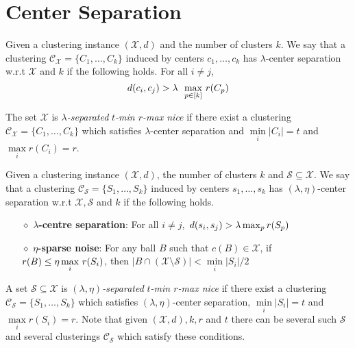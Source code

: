 \documentclass[anon,12pt]{colt2016} %
\newcommand{\mc}{\mathcal}
\begin{document}
\section{Center Separation}

\begin{definition}
\label{defn:lambdacs}
Given a clustering instance $(\mc X, d)$ and the number of clusters $k$. We say that a clustering $\mc C_{\mc X} = \{C_1, \ldots, C_k\}$ induced by centers $c_1, \ldots, c_k$ has $\lambda$-center separation w.r.t $\mc X$ and $k$ if the following holds. For all $i\neq j$, 
$$d(c_i, c_j) > \lambda \enspace\max_{p \in [k]} \thinspace r(C_p)$$
\end{definition}

\noindent The set $\mc X$ is {\it $\lambda$-separated} {\it $t$-min $r$-max nice} if there exist a clustering $\mc C_{\mc X}=\{C_1,\ldots,C_k\}$ which satisfies $\lambda$-center separation and $\min\limits_{i} \lvert C_i\rvert = t$ and $\max\limits_{i} r(C_i) = r$.

\begin{definition}
Given a clustering instance $(\mc X, d)$, the number of clusters $k$ and $\mc S \subseteq \mc X$. We say that a clustering $\mc C_{\mc S} = \{S_1, \ldots, S_k\}$ induced by centers $s_1, \ldots, s_k$ has $(\lambda, \eta)$-center separation w.r.t $\mc X, \mc S$ and $k$ if the following holds.

\begin{itemize}[nolistsep, noitemsep]
\label{defn:lambdacsnoise}	

\item[$\diamond$] {\bf $\lambda$-centre separation}: For all $i\neq j$, $\thinspace d(s_i, s_j) > \lambda \max_{p} r(S_p)$
\item[$\diamond$]{\bf $\eta$-sparse noise}: For any ball $B$ such that $c(B)\in \mathcal{X}$, if $r(B)\leq \eta\max\limits_{i} \thinspace r(S_i)$, then $|B\cap (\mc X\setminus \mc S)| < \min\limits_{i} |S_i|/2$
\end{itemize}
\end{definition}

\noindent A set $\mc S \subseteq \mc X$ is {\it $(\lambda, \eta)$-separated} {\it $t$-min $r$-max nice} if there exist a clustering $\mc C_{\mc S}=\{S_1,\ldots,S_k\}$ which satisfies $(\lambda, \eta)$-center separation,  $\min\limits_{i} \lvert S_i\rvert = t$ and $\max\limits_{i} r(S_i) = r$. Note that given $(\mc X, d), k, r$ and $t$ there can be several such $\mc S$ and several clusterings $\mc C_{\mc S}$ which satisfy these conditions.
\end{document}
